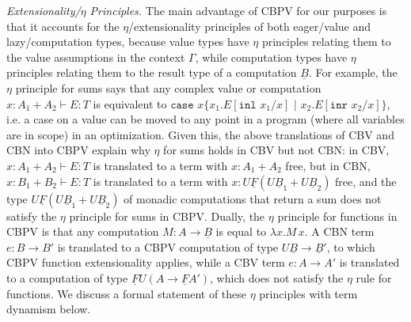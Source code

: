 \documentclass[acmsmall,screen,12pt]{acmart}
\renewcommand{\u}{\underline}
\newcommand{\pipe}{\,\,|\,\,}
\newcommand{\ltdyn}{\sqsubseteq}
\newcommand{\gtdyn}{\sqsupseteq}
\newcommand{\equidyn}{\mathrel{\gtdyn\ltdyn}}
\newcommand{\inl}{\kw{inl}}
\newcommand{\inr}{\kw{inr}}
\newcommand{\print}{\kw{print}}
\newcommand{\case}{\kw{case}}
\newcommand{\kw}[1]{\texttt{#1}\,\,}
\newcommand{\caseofXthenYelseZ}[3]{\case #1 \{ #2 \pipe #3 \}}
\begin{document}




\emph{Extensionality/$\eta$ Principles.}  The main advantage of CBPV for
our purposes is that it accounts for the $\eta$/extensionality
principles of both eager/value and lazy/computation types, because
value types have $\eta$ principles relating them to the value
assumptions in the context $\Gamma$, while computation types have $\eta$
principles relating them to the result type of a computation $\u B$.  For
example, the $\eta$ principle for sums says that any complex
value or computation $x : A_1 + A_2 \vdash E : T$ is equivalent to
$\caseofXthenYelseZ{x}{x_1.E[\inl{x_1}/x]}{x_2.E[\inr{x_2}/x]}$, i.e. a
case on a value can be moved to any point in a program (where all
variables are in scope) in an optimization.  Given this, the above
translations of CBV and CBN into CBPV explain why $\eta$ for
sums holds in CBV but not CBN: in CBV, $x : A_1 + A_2 \vdash E : T$ is
translated to a term with $x : A_1 + A_2$ free, but in CBN, $x : B_1 +
B_2 \vdash E : T$ is translated to a term with $x : U \u F(U \u B_1 + U
\u B_2)$ free, and the type $U \u F(U \u B_1 + U \u B_2)$ of monadic
computations that return a sum does not satisfy the $\eta$ principle for
sums in CBPV.  Dually, the $\eta$ principle for functions in CBPV is
that any computation $M : A \to \u B$ is equal to $\lambda x.M \, x$.  A
CBN term $e : B \to B'$ is translated to a CBPV computation of type $U
\u B \to \u B'$, to which CBPV function extensionality applies, while a
CBV term $e : A \to A'$ is translated to a computation of type $\u F U(A
\to \u F A')$, which does not satisfy the $\eta$ rule for functions.  We
discuss a formal statement of these $\eta$ principles with term
dynamism below.
\end{document}
